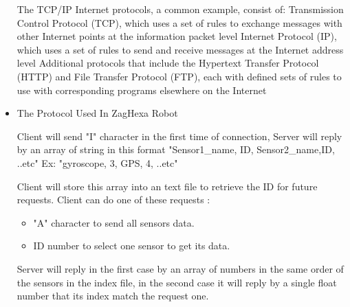 \begin{itemize}
			The TCP/IP Internet protocols, a common example, consist of:
			Transmission Control Protocol (TCP), which uses a set of rules to exchange messages with other Internet points at the information packet level
			Internet Protocol (IP), which uses a set of rules to send and receive messages at the Internet address level
			Additional protocols that include the Hypertext Transfer Protocol (HTTP) and File Transfer Protocol (FTP), each with defined sets of rules to use with corresponding programs elsewhere on the Internet
			
			\item The Protocol Used In ZagHexa Robot
			
			Client will send "I" character in the first time of connection, Server will reply by an array of string in this format {"Sensor1\_name, ID, Sensor2\_name,ID, ..etc"}
			Ex:	{"gyroscope, 3, GPS, 4, ..etc"}
			
			Client will store this array into an text file to retrieve the ID for future requests.
			Client can do one of these requests :
			\begin{itemize}
				\item "A" character  to send all sensors data.
				\item ID number to select one sensor to get its data.
			\end{itemize}
				
			Server will reply in the first case by an array of numbers in the same order of the sensors in the index file, in the second case it will reply by a single float number that its index match the request one.
			
		\end{itemize}


